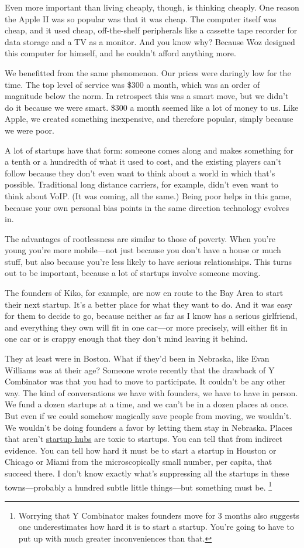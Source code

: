 \documentclass[12pt]{book}
\begin{document}
Even more important than living cheaply, though, is thinking cheaply.
One reason the Apple II was so popular was that it was cheap. The
computer itself was cheap, and it used cheap, off-the-shelf peripherals
like a cassette tape recorder for data storage and a TV as a monitor.
And you know why? Because Woz designed this computer for himself, and he
couldn't afford anything more.

We benefitted from the same phenomenon. Our prices were daringly low for
the time. The top level of service was \$300 a month, which was an order
of magnitude below the norm. In retrospect this was a smart move, but we
didn't do it because we were smart. \$300 a month seemed like a lot of
money to us. Like Apple, we created something inexpensive, and therefore
popular, simply because we were poor.

A lot of startups have that form: someone comes along and makes
something for a tenth or a hundredth of what it used to cost, and the
existing players can't follow because they don't even want to think
about a world in which that's possible. Traditional long distance
carriers, for example, didn't even want to think about VoIP. (It was
coming, all the same.) Being poor helps in this game, because your own
personal bias points in the same direction technology evolves in.

The advantages of rootlessness are similar to those of poverty. When
you're young you're more mobile---not just because you don't have a
house or much stuff, but also because you're less likely to have serious
relationships. This turns out to be important, because a lot of startups
involve someone moving.

The founders of Kiko, for example, are now en route to the Bay Area to
start their next startup. It's a better place for what they want to do.
And it was easy for them to decide to go, because neither as far as I
know has a serious girlfriend, and everything they own will fit in one
car---or more precisely, will either fit in one car or is crappy enough
that they don't mind leaving it behind.

They at least were in Boston. What if they'd been in Nebraska, like Evan
Williams was at their age? Someone wrote recently that the drawback of Y
Combinator was that you had to move to participate. It couldn't be any
other way. The kind of conversations we have with founders, we have to
have in person. We fund a dozen startups at a time, and we can't be in a
dozen places at once. But even if we could somehow magically save people
from moving, we wouldn't. We wouldn't be doing founders a favor by
letting them stay in Nebraska. Places that aren't
\href{siliconvalley.html}{startup hubs} are toxic to startups. You can
tell that from indirect evidence. You can tell how hard it must be to
start a startup in Houston or Chicago or Miami from the microscopically
small number, per capita, that succeed there. I don't know exactly
what's suppressing all the startups in these towns---probably a hundred
subtle little things---but something must be. \footnote{Worrying that Y Combinator makes founders move for 3 months also
suggests one underestimates how hard it is to start a startup. You're
going to have to put up with much greater inconveniences than that.}
\end{document}
